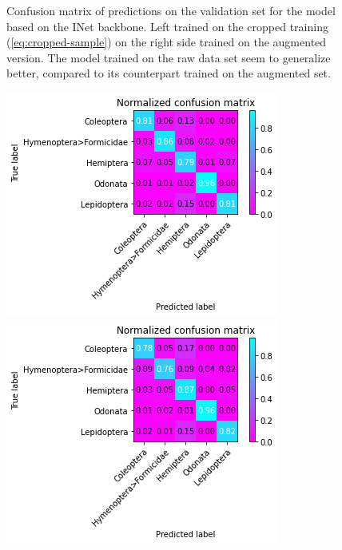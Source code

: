 \begin{figure}
\begin{multicols}{2}
\begin{minipage}{.45\textwidth}
        \end{minipage}
    \end{multicols}
    \caption{Confusion matrix of predictions on the validation set for the model based on the INet backbone. Left trained on the cropped training (\eqref{eq:cropped-sample}) on the right side trained on the augmented version.
    The model trained on the raw data set seem to generalize better, compared to its counterpart trained on the augmented set.}
    \label{fig:classification-inet-conf}
\end{figure}
\begin{figure}
    \centering
    \begin{multicols}{2}
        \begin{minipage}{.45\textwidth}
            \includegraphics[width=\textwidth]{images/classification-mobilenet.png}
        \end{minipage}
        \columnbreak
        \begin{minipage}{.45\textwidth}
            \includegraphics[width=\textwidth]{images/augmented-classification-mobilenet.png}

\end{minipage}
\end{multicols}
\end{figure}
